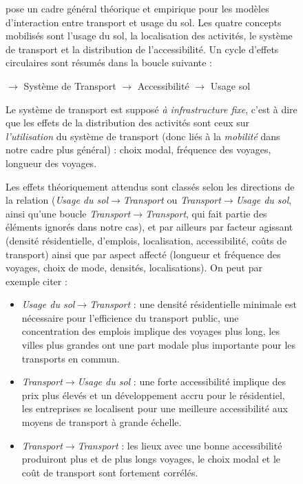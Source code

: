 
\begin{figure}[h!]
	\begin{mdframed}
		
		\cite{wegener2004land} pose un cadre général théorique et empirique pour les modèles d'interaction entre transport et usage du sol. Les quatre concepts mobilisés sont l'usage du sol, la localisation des activités, le système de transport et la distribution de l'accessibilité. Un cycle d'effets circulaires sont résumés dans la boucle suivante :
		
		\begin{center}
		\bigskip
		  $\longrightarrow$ Système de Transport $\longrightarrow$ Accessibilité $\longrightarrow$ Usage  sol
		 \bigskip
		\end{center}
		
		Le système de transport est supposé \emph{à infrastructure fixe}, c'est à dire que les effets de la distribution des activités sont ceux sur \emph{l'utilisation} du système de transport (donc liés à la \emph{mobilité} dans notre cadre plus général) : choix modal, fréquence des voyages, longueur des voyages.
		
		Les effets théoriquement attendus sont classés selon les directions de la relation (\textit{Usage du sol}$\rightarrow$\textit{Transport} ou \textit{Transport}$\rightarrow$\textit{Usage du sol}, ainsi qu'une boucle \textit{Transport}$\rightarrow$\textit{Transport}, qui fait partie des éléments ignorés dans notre cas), et par ailleurs par facteur agissant (densité résidentielle, d'emplois, localisation, accessibilité, coûts de transport) ainsi que par aspect affecté (longueur et fréquence des voyages, choix de mode, densités, localisations).  On peut par exemple citer :
		\begin{itemize}
			\item \textit{Usage du sol}$\rightarrow$\textit{Transport} : une densité résidentielle minimale est nécessaire pour l'efficience du transport public, une concentration des emplois implique des voyages plus long, les villes plus grandes ont une part modale plus importante pour les transports en commun.
			\item \textit{Transport}$\rightarrow$\textit{Usage du sol} : une forte accessibilité implique des prix plus élevés et un développement accru pour le résidentiel, les entreprises se localisent pour une meilleure accessibilité aux moyens de transport à grande échelle. 
			\item \textit{Transport}$\rightarrow$\textit{Transport} : les lieux avec une bonne accessibilité produiront plus et de plus longs voyages, le choix modal et le coût de transport sont fortement corrélés.
		\end{itemize}
		

\end{mdframed}
\end{figure}
